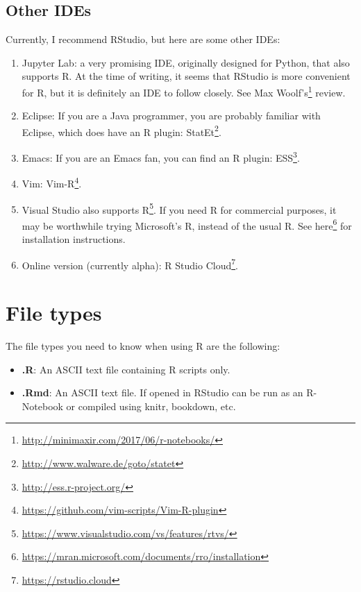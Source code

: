 \documentclass[]{book}
\providecommand{\tightlist}{%
  \setlength{\itemsep}{0pt}\setlength{\parskip}{0pt}}
\renewcommand{\href}[2]{#2\footnote{\url{#1}}}
\theoremstyle{definition}
\theoremstyle{definition}
\theoremstyle{definition}
\theoremstyle{remark}
\begin{document}
\hypertarget{other-ides}{%
\subsection{Other IDEs}\label{other-ides}}

Currently, I recommend RStudio, but here are some other IDEs:

\begin{enumerate}
\def\labelenumi{\arabic{enumi}.}
\item
  Jupyter Lab: a very promising IDE, originally designed for Python, that also supports R.
  At the time of writing, it seems that RStudio is more convenient for R, but it is definitely an IDE to follow closely.
  See \href{http://minimaxir.com/2017/06/r-notebooks/}{Max Woolf's} review.
\item
  Eclipse: If you are a Java programmer, you are probably familiar with Eclipse, which does have an R plugin: \href{http://www.walware.de/goto/statet}{StatEt}.
\item
  Emacs: If you are an Emacs fan, you can find an R plugin: \href{http://ess.r-project.org/}{ESS}.
\item
  Vim: \href{https://github.com/vim-scripts/Vim-R-plugin}{Vim-R}.
\item
  Visual Studio also \href{https://www.visualstudio.com/vs/features/rtvs/}{supports R}.
  If you need R for commercial purposes, it may be worthwhile trying Microsoft's R, instead of the usual R. See \href{https://mran.microsoft.com/documents/rro/installation}{here} for installation instructions.
\item
  Online version (currently alpha): \href{https://rstudio.cloud}{R Studio Cloud}.
\end{enumerate}

\hypertarget{file-types}{%
\section{File types}\label{file-types}}

The file types you need to know when using R are the following:

\begin{itemize}
\tightlist
\item
  \textbf{.R}: An ASCII text file containing R scripts only.
\item
  \textbf{.Rmd}: An ASCII text file. If opened in RStudio can be run as an R-Notebook or compiled using knitr, bookdown, etc.
\end{itemize}
\end{document}
